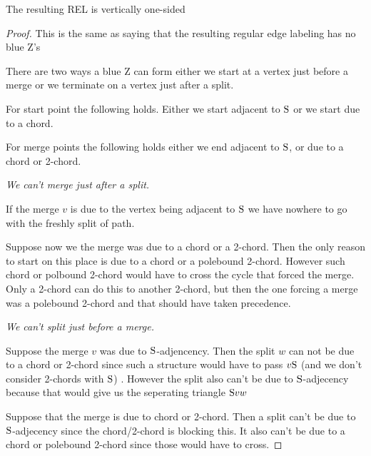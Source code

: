     \begin{lemma}
      \label{lm:sweep:vertOnsided}
      The resulting REL is vertically one-sided
    \end{lemma}
    \begin{proof}
      This is the same as saying that the resulting regular edge labeling has no blue Z's

      There are two ways a blue Z can form either we start at a vertex just before a merge or we terminate on a vertex just after a split.

      For start point the following holds. Either we start adjacent to $\mathrm{S}$ or we start due to a chord.

      For merge points the following holds either we end adjacent to $\mathrm{S}$, or due to a chord or 2-chord.

      \vspace{2ex}
      \emph{We can't merge just after a split.}

      If the merge $v$ is due to the vertex being adjacent to $\mathrm{S}$ we have nowhere to go with the freshly split of path. 

      Suppose now we the merge was due to a chord or a 2-chord. Then the only reason to start on this place is due to a chord or a polebound 2-chord. However such chord or polbound 2-chord would have to cross the cycle that forced the merge. Only a 2-chord can do this to another 2-chord, but then the one forcing a merge was a polebound 2-chord and that should have taken precedence.


      \vspace{2ex}
      \emph{We can't split just before a merge.}

      Suppose the merge $v$ was due to $\mathrm{S}$-adjencency. Then the split $w$ can not be due to a chord or 2-chord since such a structure would have to pass $v \mathrm{S}$ (and we don't consider 2-chords with $\mathrm{S}$) . However the split also can't be due to $\mathrm{S}$-adjecency because that would give us the seperating triangle $\mathrm{S} v w$

      Suppose that the merge is due to chord or 2-chord. Then a split can't be due to $\mathrm{S}$-adjecency since the chord/2-chord is blocking this. It also can't be due to a chord or polebound 2-chord since those would have to cross.

    \end{proof}


